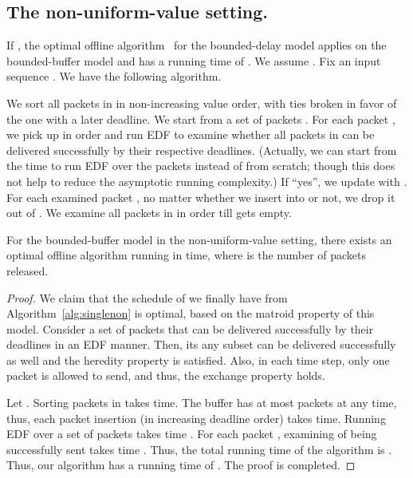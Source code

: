 \documentclass[final, 11pt]{article}
\begin{document}
\subsection{The non-uniform-value setting.}

If , the optimal offline algorithm~\cite{KLMPSS04} for the bounded-delay model applies on the bounded-buffer model and has a running time of . We assume . Fix an input sequence . We have the following algorithm.

\begin{algorithm}
We sort all packets in  in non-increasing value order, with ties broken in favor of the one with a later deadline. We start from a set of packets . For each packet , we pick up  in order and run EDF to examine whether all packets in  can be delivered successfully by their respective deadlines. (Actually, we can start from the time  to run EDF over the packets  instead of from scratch; though this does not help to reduce the asymptotic running complexity.) If ``yes'', we update  with . For each examined packet , no matter whether we insert  into  or not, we drop it out of . We examine all packets in  in order till  gets empty.
\label{alg:singlenon}
\end{algorithm}

\begin{Lemma}
For the bounded-buffer model in the non-uniform-value setting, there exists an optimal offline algorithm running in  time, where  is the number of packets released.
\label{lemma:singleoff2}
\end{Lemma}

\begin{proof}
We claim that the schedule of  we finally have from Algorithm~\ref{alg:singlenon} is optimal, based on the matroid property of this model. Consider a set of packets that can be delivered successfully by their deadlines in an EDF manner. Then, its any subset can be delivered successfully as well and the heredity property is satisfied. Also, in each time step, only one packet is allowed to send, and thus, the exchange property holds.

Let . Sorting packets in  takes  time. The buffer has at most  packets at any time, thus, each packet insertion (in increasing deadline order) takes  time. Running EDF over a set of packets  takes time . For each packet , examining  of being successfully sent takes time . Thus, the total running time of the algorithm is . Thus, our algorithm has a running time of . The proof is completed. 
\end{proof}
\end{document}
